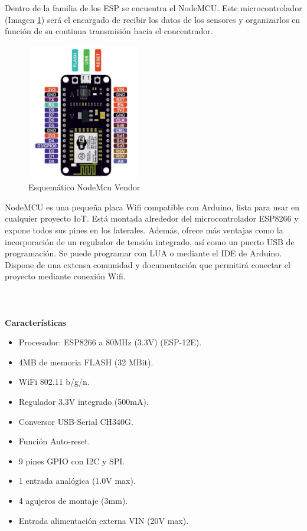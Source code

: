     Dentro de la familia de los ESP se encuentra el NodeMCU. Este microcontrolador (Imagen \ref{imag:nodemcu}) será el encargado de recibir los datos de los sensores y organizarlos en función de su continua transmisión hacia el concentrador.\\

    \begin{figure}[h]
        \centering
        \includegraphics[width=5cm, height=6cm]{imagenes/nodemcu0.jpg}
        \caption{Esquemático NodeMcu Vendor}
        \label{imag:nodemcu}
    \end{figure}
    
    
    NodeMCU es una pequeña placa Wifi compatible con Arduino, lista para usar en cualquier proyecto IoT. Está montada alrededor del microcontrolador ESP8266 y expone todos sus pines en los laterales. Además, ofrece más ventajas como la incorporación de un regulador de tensión integrado, así como un puerto USB de programación. Se puede programar con LUA o mediante el IDE de Arduino.\\

    Dispone de una extensa comunidad y documentación que permitirá conectar el proyecto mediante conexión Wifi.\\\\\\\\

    \textbf{Características}
    \begin{itemize}
        \item Procesador: ESP8266 a 80MHz (3.3V) (ESP-12E).
        \item 4MB de memoria FLASH (32 MBit).
        \item WiFi 802.11 b/g/n.
        \item Regulador 3.3V integrado (500mA).
        \item Conversor USB-Serial CH340G.
        \item Función Auto-reset.
        \item 9 pines GPIO con I2C y SPI.
        \item 1 entrada analógica (1.0V max).
        \item 4 agujeros de montaje (3mm).
        \item Entrada alimentación externa VIN (20V max).
    \end{itemize}

